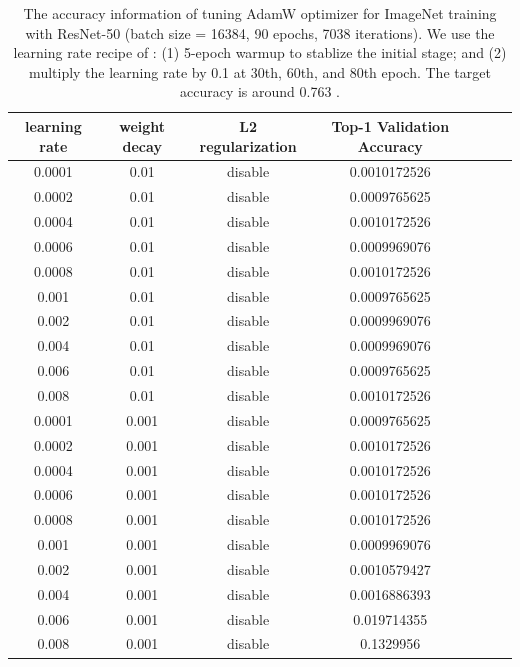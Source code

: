 \begin{table}[ht]
\renewcommand{\arraystretch}{1.3}
\caption{The accuracy information of tuning AdamW optimizer for ImageNet training with ResNet-50 (batch size = 16384, 90 epochs, 7038 iterations). We use the learning rate recipe of \citep{goyal2017accurate}: (1) 5-epoch warmup to stablize the initial stage; and (2) multiply the learning rate by 0.1 at 30th, 60th, and 80th epoch. The target accuracy is around 0.763 \citep{goyal2017accurate}.}
\centering
\begin{tabular}{|c|c|c|c|c|c|c|}
\hline
learning rate & weight decay & L2 regularization & Top-1 Validation Accuracy \\
\hline
\hline
0.0001 & 0.01 & disable & 0.0010172526 \\
\hline
0.0002 & 0.01 & disable & 0.0009765625 \\
\hline
0.0004 & 0.01 & disable & 0.0010172526 \\
\hline
0.0006 & 0.01 & disable & 0.0009969076 \\
\hline
0.0008 & 0.01 & disable & 0.0010172526 \\
\hline
0.001 & 0.01 & disable & 0.0009765625 \\
\hline
0.002 & 0.01 & disable & 0.0009969076 \\
\hline
0.004 & 0.01 & disable & 0.0009969076 \\
\hline
0.006 & 0.01 & disable & 0.0009765625 \\
\hline
0.008 & 0.01 & disable & 0.0010172526 \\
\hline
0.0001 & 0.001 & disable & 0.0009765625 \\
\hline
0.0002 & 0.001 & disable & 0.0010172526 \\
\hline
0.0004 & 0.001 & disable & 0.0010172526 \\
\hline
0.0006 & 0.001 & disable & 0.0010172526 \\
\hline
0.0008 & 0.001 & disable & 0.0010172526 \\
\hline
0.001 & 0.001 & disable & 0.0009969076 \\
\hline
0.002 & 0.001 & disable & 0.0010579427 \\
\hline
0.004 & 0.001 & disable & 0.0016886393 \\
\hline
0.006 & 0.001 & disable & 0.019714355 \\
\hline
0.008 & 0.001 & disable & 0.1329956 \\
\hline
\end{tabular}
\label{table:imagenet_adam_tuning_nol2_1}
\end{table}

